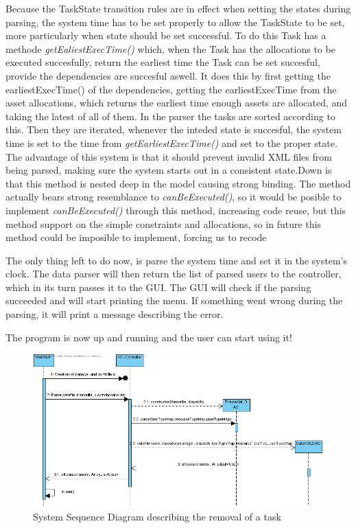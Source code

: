 			Because the TaskState transition rules are in effect when setting the states during parsing, the system time has to be set properly to allow the TaskState to be set, more particularly when state should be set successful. To do this Task has a methode \emph{getEaliestExecTime()} which, when the Task has the allocations to be executed succesfully, return the earliest time the Task can be set succesful, provide the dependencies are succesful aswell. It does this by first getting the earliestExecTime() of the dependencies, getting the earliestExecTime from the asset allocations, which returns the earliest time enough assets are allocated, and taking the latest of all of them. In the parser the tasks are sorted according to this. Then they are iterated, whenever the inteded state is succesful, the system time is set to the time from \emph{getEarliestExecTime()} and set to the proper state. The advantage of this system is that it should prevent invalid XML files from being parsed, making sure the system starts out in a consistent state.Down is that this method is nested deep in the model causing strong binding. The method actually bears strong resemblance to \emph{canBeExecuted()}, so it would be posible to implement \emph{canBeExecuted()} through this method, increasing code reuse, but this method support on the simple constraints and allocations, so in future this method could be imposible to implement, forcing us to recode 
			
			The only thing left to do now, is parse the system time and set it in the system's clock. The data parser will then return the list of parsed users to the controller, which in its turn passes it to the GUI. The GUI will check if the parsing succeeded and will start printing the menu. If something went wrong during the parsing, it will print a message describing the error.
			
			The program is now up and running and the user can start using it!
			
			\begin{figure}[H]
				\begin{center}
					\includegraphics[scale=0.5]{images/System_Initiation.jpg}
				\end{center}
				\caption{System Sequence Diagram describing the removal of a task}
			\end{figure}
		
